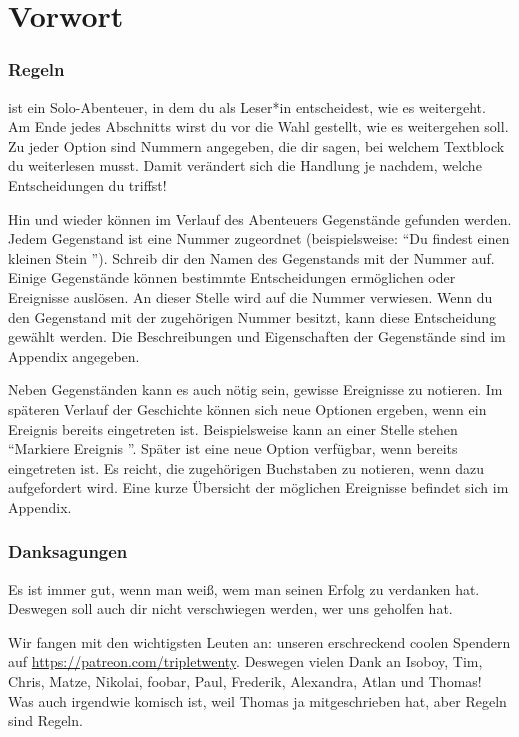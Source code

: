 
\chapter*{Vorwort}

\subsection{Regeln}

 ist ein Solo-Abenteuer, in dem du als Leser*in entscheidest, wie es weitergeht.
Am Ende jedes Abschnitts wirst du vor die Wahl gestellt, wie es weitergehen soll.
Zu jeder Option sind Nummern angegeben, die dir sagen, bei welchem Textblock du weiterlesen musst.
Damit verändert sich die Handlung je nachdem, welche Entscheidungen du triffst!

Hin und wieder können im Verlauf des Abenteuers Gegenstände gefunden werden.
Jedem Gegenstand ist eine Nummer zugeordnet (beispielsweise: ``Du findest einen kleinen Stein '').
Schreib dir den Namen des Gegenstands mit der Nummer auf.
Einige Gegenstände können bestimmte Entscheidungen ermöglichen oder Ereignisse auslösen.
An dieser Stelle wird auf die Nummer verwiesen.
Wenn du den Gegenstand mit der zugehörigen Nummer besitzt, kann diese Entscheidung gewählt werden.
Die Beschreibungen und Eigenschaften der Gegenstände sind im Appendix angegeben.

Neben Gegenständen kann es auch nötig sein, gewisse Ereignisse zu notieren.
Im späteren Verlauf der Geschichte können sich neue Optionen ergeben, wenn ein Ereignis bereits eingetreten ist.
Beispielsweise kann an einer Stelle stehen ``Markiere Ereignis ''.
Später ist eine neue Option verfügbar, wenn  bereits eingetreten ist.
Es reicht, die zugehörigen Buchstaben zu notieren, wenn dazu aufgefordert wird.
Eine kurze Übersicht der möglichen Ereignisse befindet sich im Appendix.

\subsection{Danksagungen}

Es ist immer gut, wenn man weiß, wem man seinen Erfolg zu verdanken hat. Deswegen soll auch dir nicht verschwiegen werden, wer uns geholfen hat.

Wir fangen mit den wichtigsten Leuten an: unseren erschreckend coolen Spendern auf \url{https://patreon.com/tripletwenty}.
Deswegen vielen Dank an Isoboy, Tim, Chris, Matze, Nikolai, foobar, Paul, Frederik, Alexandra, Atlan und Thomas!
Was auch irgendwie komisch ist, weil Thomas ja mitgeschrieben hat, aber Regeln sind Regeln.

